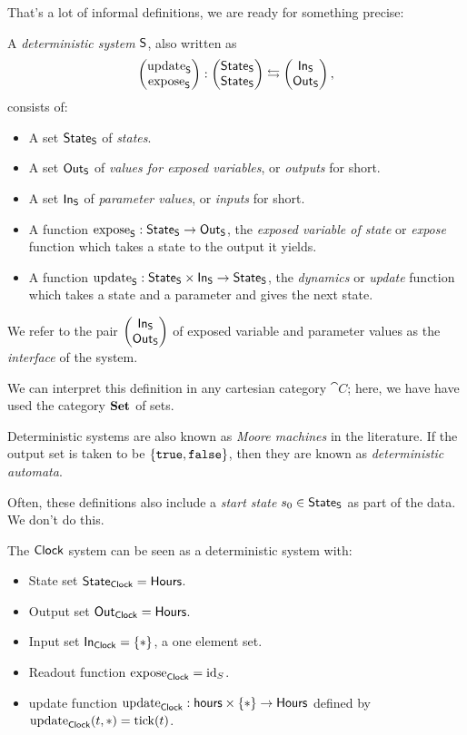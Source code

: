 \documentclass[DynamicalBook]{subfiles}
\begin{document}
That's a lot of informal definitions, we are ready for something precise:
\begin{definition}\label{def.deterministic_system}
  A \emph{deterministic system} $\mathsf{S}$, also written as $$\begin{pmatrix}{\mathrm{update}_{\mathsf{S}}} \\ {\mathrm{expose}_{\mathsf{S}}} \end{pmatrix} : \begin{pmatrix}{\mathsf{State}_{\mathsf{S}}} \\ {\mathsf{State}_{\mathsf{S}}} \end{pmatrix} \leftrightarrows \begin{pmatrix}{\mathsf{In}_{\mathsf{S}}} \\ {\mathsf{Out}_{\mathsf{S}}} \end{pmatrix},$$ consists of:
  \begin{itemize}
    \item A set $\mathsf{State}_{\mathsf{S}}$ of \emph{states}.
    \item A set $\mathsf{Out}_{\mathsf{S}}$ of \emph{values for exposed variables}, or \emph{outputs}
      for short.
    \item A set $\mathsf{In}_{\mathsf{S}}$ of \emph{parameter values}, or \emph{inputs} for short.
    \item A function $\mathrm{expose}_{\mathsf{S}} : \mathsf{State}_{\mathsf{S}} \to \mathsf{Out}_{\mathsf{S}}$, the \emph{exposed variable of state} or
      \emph{expose} function which takes a state to the output it yields. 
    \item A function $\mathrm{update}_{\mathsf{S}} : \mathsf{State}_{\mathsf{S}} \times \mathsf{In}_{\mathsf{S}} \to \mathsf{State}_{\mathsf{S}}$, the \emph{dynamics} or
      \emph{update} function which takes a state and a parameter and gives the
      next state.
  \end{itemize}
  We refer to the pair $\begin{pmatrix}{\mathsf{In}_{\mathsf{S}}} \\ {\mathsf{Out}_{\mathsf{S}}} \end{pmatrix}$ of exposed variable and parameter values as
  the \emph{interface} of the system.

We can interpret this definition in any cartesian category $\cat{C}$; here, we
have have used the category $\textbf{Set}$ of sets.
\end{definition}

\begin{remark}
  Deterministic systems are also known as \emph{Moore machines} in the
  literature. If the output set is taken to be $\{\mathtt{true},
  \mathtt{false}\}$, then they are known as \emph{deterministic automata}.

  Often, these definitions also include a \emph{start state} $s_0 \in \mathsf{State}_{\mathsf{S}}$
  as part of the data. We don't do this.
\end{remark}

\begin{example}\label{ex.clock_system}
  The $\mathsf{Clock}$ system can be seen as a deterministic system with:
  \begin{itemize}
  \item State set $\mathsf{State}_{\mathsf{Clock}} = \mathsf{Hours}$.
  \item Output set $\mathsf{Out}_{\mathsf{Clock}} = \mathsf{Hours}$.
  \item Input set $\mathsf{In}_{\mathsf{Clock}} = \{\ast\}$, a one element set.
  \item Readout function $\mathrm{expose}_{\mathsf{Clock}} = \mathrm{id}_{S}$.
  \item update function $\mathrm{update}_{\mathsf{Clock}} : \mathsf{hours} \times \{\ast\} \to \mathsf{Hours}$
    defined by $\mathrm{update}_{\mathsf{Clock}}(t, \ast) = \mathrm{tick}(t)$.
  \end{itemize}
\end{example}
\end{document}
